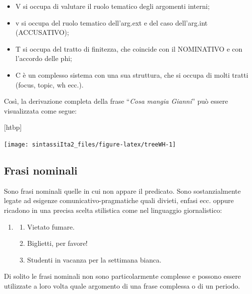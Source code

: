 \documentclass[
  a4paper,
  twoside,
  11pt,
  chapterprefix=false,
  bibliography=totocnumbered,
  listof=flat]{scrbook}
\makeatletter
\providecommand{\tightlist}{%
  \setlength{\itemsep}{0pt}\setlength{\parskip}{0pt}}
\def\fps@figure{htbp}
\renewenvironment{figure}[1][\fps@figure]{
  \edef\@tempa{\noexpand\@float{figure}[#1]} 
  \@tempa
  \sffamily
}{
  \end@float
}
\makeatother
\begin{document}
\begin{itemize}
\tightlist
\item
  V si occupa di valutare il ruolo tematico degli argomenti interni;
\item
  v si occupa del ruolo tematico dell'arg.ext e del caso dell'arg.int (ACCUSATIVO);
\item
  T si occupa del tratto di finitezza, che coincide con il NOMINATIVO e con l'accordo delle phi;
\item
  C è un complesso sistema con una sua struttura, che si occupa di molti tratti (focus, topic, wh ecc.).
\end{itemize}

Così, la derivazione completa della frase \enquote{\emph{Cosa mangia Gianni}} può essere visualizzata come segue:

\begin{figure}

{\centering \texttt{[image: sintassiIta2\_files/figure-latex/treeWH-1]} 

}

\caption{Costruzione con movimento wh}\label{fig:treeWH}
\end{figure}

\hypertarget{frasi-nominali}{%
\subsection{Frasi nominali}\label{frasi-nominali}}

Sono frasi nominali quelle in cui non appare il predicato. Sono sostanzialmente legate ad esigenze comunicativo-pragmatiche quali divieti, enfasi ecc. oppure ricadono in una precisa scelta stilistica come nel linguaggio giornalistico:

\begin{enumerate}
\def\labelenumi{(\arabic{enumi})}
\setcounter{enumi}{16}
\item
  \begin{enumerate}
  \def\labelenumii{\alph{enumii}.}
  \tightlist
  \item
    Vietato fumare.
  \item
    Biglietti, per favore!
  \item
    Studenti in vacanza per la settimana bianca.
  \end{enumerate}
\end{enumerate}

Di solito le frasi nominali non sono particolarmente complesse e possono essere utilizzate a loro volta quale argomento di una frase complessa o di un periodo.
\end{document}
